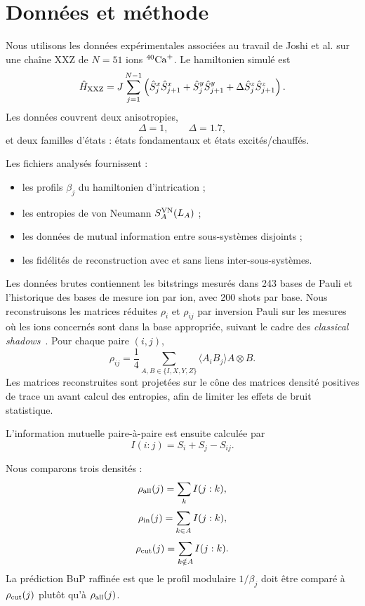 \documentclass[11pt,a4paper]{article}
\begin{document}
\section{Données et méthode}

Nous utilisons les données expérimentales associées au travail de Joshi et al. sur une chaîne XXZ de $N=51$ ions $^{40}{\rm Ca}^+$. Le hamiltonien simulé est
\[
\hat H_{\rm XXZ}
=
J\sum_{j=1}^{N-1}
\left(
\hat S_j^x\hat S_{j+1}^x
+
\hat S_j^y\hat S_{j+1}^y
+
\Delta \hat S_j^z\hat S_{j+1}^z
\right).
\]
Les données couvrent deux anisotropies,
\[
\Delta=1,
\qquad
\Delta=1.7,
\]
et deux familles d'états : états fondamentaux et états excités/chauffés.

Les fichiers analysés fournissent :
\begin{itemize}
    \item les profils $\beta_j$ du hamiltonien d'intrication ;
    \item les entropies de von Neumann $S_A^{\rm VN}(L_A)$ ;
    \item les données de mutual information entre sous-systèmes disjoints ;
    \item les fidélités de reconstruction avec et sans liens inter-sous-systèmes.
\end{itemize}

Les données brutes contiennent les bitstrings mesurés dans 243 bases de Pauli et l'historique des bases de mesure ion par ion, avec 200 shots par base. Nous reconstruisons les matrices réduites $\rho_i$ et $\rho_{ij}$ par inversion Pauli sur les mesures où les ions concernés sont dans la base appropriée, suivant le cadre des \emph{classical shadows}~\cite{Huang2020}. Pour chaque paire $(i,j)$,
\[
\rho_{ij}
=
\frac14
\sum_{A,B\in\{I,X,Y,Z\}}
\langle A_i B_j\rangle A\otimes B.
\]
Les matrices reconstruites sont projetées sur le cône des matrices densité positives de trace un avant calcul des entropies, afin de limiter les effets de bruit statistique.

L'information mutuelle paire-à-paire est ensuite calculée par
\[
I(i:j)
=
S_i+S_j-S_{ij}.
\]

Nous comparons trois densités :
\[
\rho_{\rm all}(j)=\sum_k I(j:k),
\]
\[
\rho_{\rm in}(j)=\sum_{k\in A}I(j:k),
\]
\[
\rho_{\rm cut}(j)=\sum_{k\notin A}I(j:k).
\]
La prédiction BuP raffinée est que le profil modulaire $1/\beta_j$ doit être comparé à $\rho_{\rm cut}(j)$ plutôt qu'à $\rho_{\rm all}(j)$.
\end{document}
